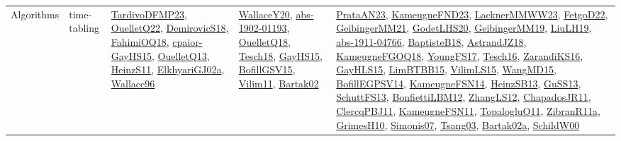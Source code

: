 {\begin{longtable}{lp{3cm}>{\raggedright}p{6cm}>{\raggedright}p{6cm}p{8cm}}
Algorithms & time-tabling & \href{papers/TardivoDFMP23.pdf}{TardivoDFMP23}\cite{TardivoDFMP23}, \href{papers/OuelletQ22.pdf}{OuelletQ22}\cite{OuelletQ22}, \href{papers/DemirovicS18.pdf}{DemirovicS18}\cite{DemirovicS18}, \href{articles/FahimiOQ18.pdf}{FahimiOQ18}\cite{FahimiOQ18}, \href{papers/cpaior-GayHS15.pdf}{cpaior-GayHS15}\cite{cpaior-GayHS15}, \href{papers/OuelletQ13.pdf}{OuelletQ13}\cite{OuelletQ13}, \href{papers/HeinzS11.pdf}{HeinzS11}\cite{HeinzS11}, \href{papers/ElkhyariGJ02a.pdf}{ElkhyariGJ02a}\cite{ElkhyariGJ02a}, \href{articles/Wallace96.pdf}{Wallace96}\cite{Wallace96} & \href{articles/WallaceY20.pdf}{WallaceY20}\cite{WallaceY20}, \href{articles/abs-1902-01193.pdf}{abs-1902-01193}\cite{abs-1902-01193}, \href{papers/OuelletQ18.pdf}{OuelletQ18}\cite{OuelletQ18}, \href{papers/Tesch18.pdf}{Tesch18}\cite{Tesch18}, \href{papers/GayHS15.pdf}{GayHS15}\cite{GayHS15}, \href{papers/BofillGSV15.pdf}{BofillGSV15}\cite{BofillGSV15}, \href{papers/Vilim11.pdf}{Vilim11}\cite{Vilim11}, \href{papers/Bartak02.pdf}{Bartak02}\cite{Bartak02} & \href{articles/PrataAN23.pdf}{PrataAN23}\cite{PrataAN23}, \href{papers/KameugneFND23.pdf}{KameugneFND23}\cite{KameugneFND23}, \href{articles/LacknerMMWW23.pdf}{LacknerMMWW23}\cite{LacknerMMWW23}, \href{articles/FetgoD22.pdf}{FetgoD22}\cite{FetgoD22}, \href{papers/GeibingerMM21.pdf}{GeibingerMM21}\cite{GeibingerMM21}, \href{papers/GodetLHS20.pdf}{GodetLHS20}\cite{GodetLHS20}, \href{papers/GeibingerMM19.pdf}{GeibingerMM19}\cite{GeibingerMM19}, \href{papers/LiuLH19.pdf}{LiuLH19}\cite{LiuLH19}, \href{articles/abs-1911-04766.pdf}{abs-1911-04766}\cite{abs-1911-04766}, \href{articles/BaptisteB18.pdf}{BaptisteB18}\cite{BaptisteB18}, \href{papers/AstrandJZ18.pdf}{AstrandJZ18}\cite{AstrandJZ18}, \href{papers/KameugneFGOQ18.pdf}{KameugneFGOQ18}\cite{KameugneFGOQ18}, \href{papers/YoungFS17.pdf}{YoungFS17}\cite{YoungFS17}, \href{papers/Tesch16.pdf}{Tesch16}\cite{Tesch16}, \href{articles/ZarandiKS16.pdf}{ZarandiKS16}\cite{ZarandiKS16}, \href{papers/GayHLS15.pdf}{GayHLS15}\cite{GayHLS15}, \href{papers/LimBTBB15.pdf}{LimBTBB15}\cite{LimBTBB15}, \href{papers/VilimLS15.pdf}{VilimLS15}\cite{VilimLS15}, \href{articles/WangMD15.pdf}{WangMD15}\cite{WangMD15}, \href{papers/BofillEGPSV14.pdf}{BofillEGPSV14}\cite{BofillEGPSV14}, \href{articles/KameugneFSN14.pdf}{KameugneFSN14}\cite{KameugneFSN14}, \href{articles/HeinzSB13.pdf}{HeinzSB13}\cite{HeinzSB13}, \href{papers/GuSS13.pdf}{GuSS13}\cite{GuSS13}, \href{papers/SchuttFS13.pdf}{SchuttFS13}\cite{SchuttFS13}, \href{papers/BonfiettiLBM12.pdf}{BonfiettiLBM12}\cite{BonfiettiLBM12}, \href{papers/ZhangLS12.pdf}{ZhangLS12}\cite{ZhangLS12}, \href{papers/ChapadosJR11.pdf}{ChapadosJR11}\cite{ChapadosJR11}, \href{papers/ClercqPBJ11.pdf}{ClercqPBJ11}\cite{ClercqPBJ11}, \href{papers/KameugneFSN11.pdf}{KameugneFSN11}\cite{KameugneFSN11}, \href{articles/TopalogluO11.pdf}{TopalogluO11}\cite{TopalogluO11}, \href{papers/ZibranR11a.pdf}{ZibranR11a}\cite{ZibranR11a}, \href{papers/GrimesH10.pdf}{GrimesH10}\cite{GrimesH10}, \href{articles/Simonis07.pdf}{Simonis07}\cite{Simonis07}, \href{articles/Tsang03.pdf}{Tsang03}\cite{Tsang03}, \href{papers/Bartak02a.pdf}{Bartak02a}\cite{Bartak02a}, \href{articles/SchildW00.pdf}{SchildW00}\cite{SchildW00}\\

\end{longtable}}
